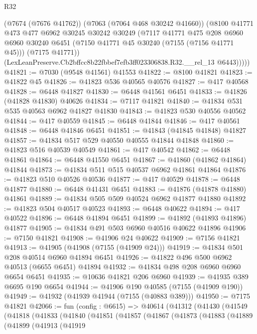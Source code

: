 \begin{lexlean}{R32}
\begin{coremodule}
          (@7674 (@7676 @41762))
          (@7063 (@7064 @468 @30242 @41660))
          (@8100
            @41771
            @473
            @477
            @6962
            @30245
            @30242
            @30249
            (@7117
              @41771
              @475
              @208
              @6960
              @6960
              @30240
              @6451
              (@7150 @41771 @45 @30240 (@7155 (@7156 @41771 @45)))
              (@7175 @41771))
            (LexLeanPreserve.Cb2bffcc8b22fbbef7efb3ff023306838.R32.__rel_13 @6443)))))
@41821 := @7030 (@9548 @41561) @41553
@41822 := @8100 @41821
@41823 := @41822 @45
@41826 := @41823 @536 @40565 @40576
@41827 := @417 @40568
@41828 := @6448 @41827
@41830 := @6448 @41561 @6451
@41833 := @41826 (@41828 @41830) @40626
@41834 := @7117 @41821
@41840 := @41834 @531 @535 @40563 @6962 @41827 @41830
@41843 := @41823 @530 @40556 @40562
@41844 := @417 @40559
@41845 := @6448 @41844
@41846 := @417 @40561
@41848 := @6448 @41846 @6451
@41851 := @41843 (@41845 @41848) @41827
@41857 := @41834 @517 @529 @40550 @40555 @41844 @41848
@41860 := @41823 @516 @40539 @40549
@41861 := @417 @40542
@41862 := @6448 @41861
@41864 := @6448 @41550 @6451
@41867 := @41860 (@41862 @41864) @41844
@41873 := @41834 @511 @515 @40537 @6962 @41861 @41864
@41876 := @41823 @510 @40526 @40536
@41877 := @417 @40529
@41878 := @6448 @41877
@41880 := @6448 @41431 @6451
@41883 := @41876 (@41878 @41880) @41861
@41889 := @41834 @505 @509 @40524 @6962 @41877 @41880
@41892 := @41823 @504 @40517 @40523
@41893 := @6448 @40622
@41894 := @417 @40522
@41896 := @6448 @41894 @6451
@41899 := @41892 (@41893 @41896) @41877
@41905 := @41834 @491 @503 @6960 @40516 @40622 @41896
@41906 := @7150 @41821
@41908 := @41906 @24 @40622
@41909 := @7156 @41821
@41913 := @41905 (@41908 (@7155 (@41909 @24)))
@41919 := @41834 @501 @208 @40514 @6960 @41894 @6451
@41926 := @41822 @496 @500 @6962 @40513 (@6655 @6451) @41894
@41932 := @41834 @498 @208 @6960 @6960 @6654 @6451
@41935 := @10636 @41821 @206 @6960
@41939 := @41935 @389 @6695 @190 @6654
@41944 := @41906 @190 @40585 (@7155 (@41909 @190))
@41949 := @41932 (@41939 @41944 (@7155 (@40883 @389)))
@41950 := @7175 @41821
@42066 := fun (config : @6615) =>
  @40614
    (@41312
      (@41430
        (@41549
          (@41818
            (@41833
              (@41840
                (@41851
                  (@41857
                    (@41867
                      (@41873
                        (@41883
                          (@41889
                            (@41899
                              (@41913
                                (@41919

\end{coremodule}
\end{lexlean}
